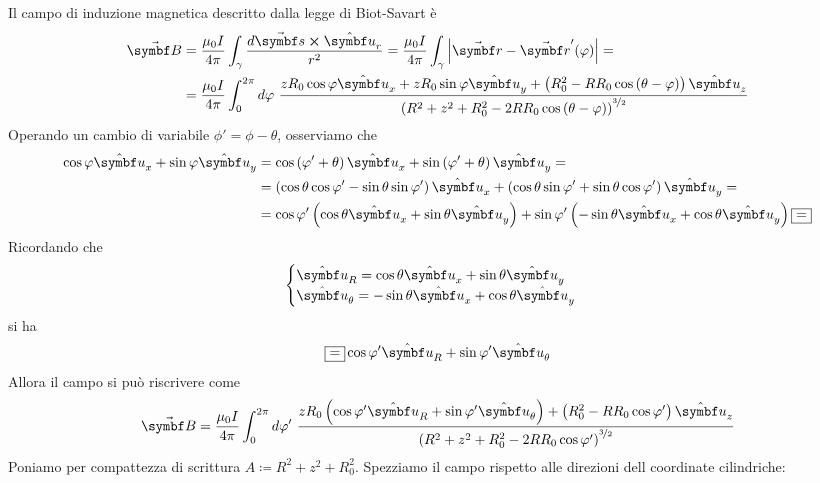 Il campo di induzione magnetica descritto dalla legge di Biot-Savart è
\begin{align*}
	\vba{B}&=\frac{\mu_0 I}{4\pi }\int_{\gamma}\frac{d\vba{s}\cross\vbh{u}_r}{r^2}=\frac{\mu_0 I}{4\pi}\int_{\gamma}{\abs{\vba{r}-\vba{r}'(\phi)}}=\\
	&=\frac{\mu_0 I}{4\pi }\int_0^{2\pi}d\phi\ \frac{zR_0\cos\phi\vbh{u}_x+zR_0\sin\phi\vbh{u}_y+\left(R_0^2-RR_0\cos\left(\theta-\phi\right)\right)\vbh{u}_z}{\left(R^2+z^2+R_0^2-2RR_0\cos\left(\theta-\phi\right)\right)^{\nicefrac{3}{2}}}
\end{align*}
Operando un cambio di variabile $\phi'=\phi-\theta$, osserviamo che
\begin{align*}
	\cos\phi\vbh{u}_x+\sin\phi\vbh{u}_y&=\cos\left(\phi'+\theta\right)\vbh{u}_x+\sin\left(\phi'+\theta\right)\vbh{u}_y=\\
	&=\left(\cos\theta\cos\phi'-\sin\theta\sin\phi'\right)\vbh{u}_x+\left(\cos\theta\sin\phi'+\sin\theta\cos\phi'\right)\vbh{u}_y=\\
	&=\cos\phi'\left(\cos\theta\vbh{u}_x+\sin\theta\vbh{u}_y\right)+\sin\phi'\left(-\sin\theta\vbh{u}_x+\cos\theta\vbh{u}_y\right)\squarequal
\end{align*}
Ricordando che
\begin{equation*}
	\begin{cases}
		\vbh{u}_R=\cos\theta\vbh{u}_x+\sin\theta\vbh{u}_y\\
		\vbh{u}_{\theta}=-\sin\theta\vbh{u}_x+\cos\theta\vbh{u}_y
	\end{cases}
\end{equation*}
si ha
\begin{equation*}
	\squarequal \cos\phi'\vbh{u}_R+\sin\phi'\vbh{u}_\theta
\end{equation*}
Allora il campo si può riscrivere come
\begin{equation*}
	\vba{B}=\frac{\mu_0 I}{4\pi }\int_0^{2\pi}d\phi'\ \frac{zR_0\left(\cos\phi'\vbh{u}_R+\sin\phi'\vbh{u}_\theta\right)+\left(R_0^2-RR_0\cos\phi'\right)\vbh{u}_z}{\left(R^2+z^2+R_0^2-2RR_0\cos\phi'\right)^{\nicefrac{3}{2}}}
\end{equation*}
Poniamo per compattezza di scrittura $A\coloneqq R^2+z^2+R_0^2$. Spezziamo il campo rispetto alle direzioni dell coordinate cilindriche:
